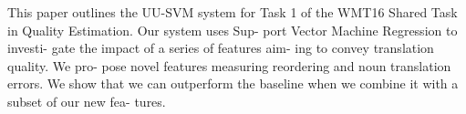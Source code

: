 This paper outlines the UU-SVM system for Task 1 of the WMT16 Shared Task in Quality Estimation. Our system uses Sup- port Vector Machine Regression to investi- gate the impact of a series of features aim- ing to convey translation quality. We pro- pose novel features measuring reordering and noun translation errors. We show that we can outperform the baseline when we combine it with a subset of our new fea- tures.
